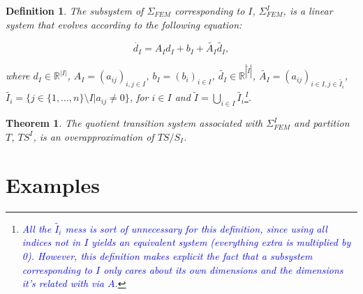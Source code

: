 \documentclass{article}
\newtheorem{theorem}{Theorem}
\newtheorem{definition}{Definition}
\newtheorem{problem}{Problem}
\newcommand*{\R}{\mathbb{R}}
\newcommand*{\fran}[1]{\textcolor{blue}{#1}}
\begin{document}
\begin{definition}

The subsystem of $\Sigma_{FEM}$ corresponding to $I$,
$\Sigma_{FEM}^I$, is a linear system that evolves according to the following
equation:

\begin{equation}
    \dot{d_I} = A_I d_I + b_I + \tilde{A_I}\tilde{d_I},
\end{equation}

where $d_I \in \R^{|I|}$, $A_I = (a_{ij})_{i, j \in I}$, $b_I = (b_i)_{i
\in I}$, $\tilde{d_I} \in \R^{|\tilde{I}|} $, $\tilde{A_I} = (a_{ij})_{i \in I, j
\in \tilde{I_i}}$, $\tilde{I_i} = \{j \in \{1,...,n\} \setminus I | a_{ij} \neq 0\}$, for $i
\in I$ and $\tilde{I} = \bigcup_{i \in I} \tilde{I_i}$\footnote{\fran{All the
$\tilde{I_i}$ mess is sort of unnecessary for this definition, since using all
indices not in $I$ yields an equivalent system (everything extra is multiplied
by 0). However, this definition makes explicit the fact that a subsystem
corresponding to $I$ only cares about its own dimensions and the dimensions it's
related with via $A$.}}.

\end{definition}

%
%
%
%
%     
%

\begin{theorem}

The quotient transition system associated with $\Sigma_{FEM}^I$ and
partition $T$, $TS^I$, is an overapproximation of $TS/S_I$.
    
\end{theorem}

\section{Examples}
\label{sec:examples}
\end{document}
